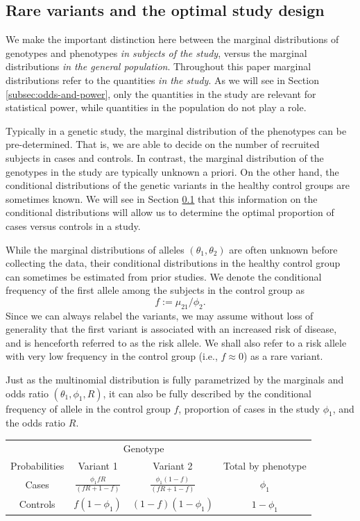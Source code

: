 \subsection{Rare variants and the optimal study design}
\label{subsec:optimal-design} 


We make the important distinction here between the marginal distributions of genotypes and phenotypes \emph{in subjects of the study}, versus the marginal distributions \emph{in the general population}.
Throughout this paper marginal distributions refer to the quantities \emph{in the study}.
As we will see in Section \ref{subsec:odds-and-power}, only the quantities in the study are relevant for statistical power, while quantities in the population do not play a role.

Typically in a genetic study, the marginal distribution of the phenotypes can be pre-determined.
That is, we are able to decide on the number of recruited subjects in cases and controls.
In contrast, the marginal distribution of the genotypes in the study are typically unknown a priori. 
On the other hand, the conditional distributions of the genetic variants in the healthy control groups are sometimes known.
We will see in Section \ref{subsec:optimal-design} that this information on the conditional distributions will allow us to determine the optimal proportion of cases versus controls in a study.


While the marginal distributions of alleles $(\theta_1, \theta_2)$ are often unknown before collecting the data, their conditional distributions in the healthy control group can sometimes be estimated from prior studies.
We denote the conditional frequency of the first allele among the subjects in the control group as
$$
f := \mu_{21} / \phi_2.
$$
Since we can always relabel the variants, we may assume without loss of generality that the first variant is associated with an increased risk of disease, and is henceforth referred to as the risk allele.
We shall also refer to a risk allele with very low frequency in the control group (i.e., $f\approx 0$) as a rare variant.

Just as the multinomial distribution is fully parametrized by the marginals and odds ratio  $(\theta_1, \phi_1, R)$, it can also be fully described by the conditional frequency of allele in the control group $f$, proportion of cases in the study $\phi_1$, and the odds ratio $R$.

\begin{center}
    \begin{tabular}{cccc}
    \hline
    & \multicolumn{2}{c}{Genotype} \\
    \cline{2-3}
    Probabilities & Variant 1 & Variant 2 & Total by phenotype \\
    \hline
    Cases & $\frac{\phi_1fR}{(fR+1-f)}$ & $\frac{\phi_1(1-f)}{(fR+1-f)}$ & $\phi_1$ \\
    Controls & $f(1-\phi_1)$ & $(1-f)(1-\phi_1)$ & $1-\phi_1$ \\
    \hline
    \end{tabular}
\end{center}

